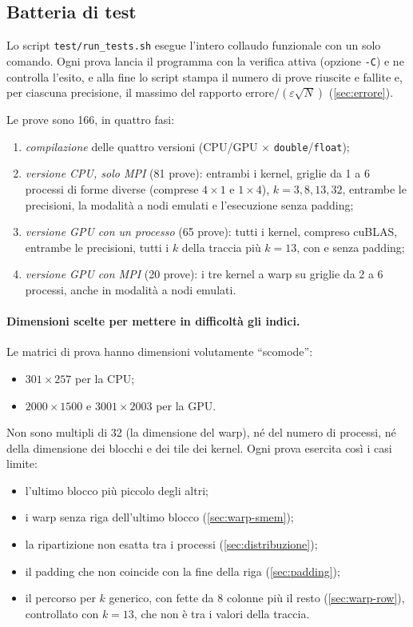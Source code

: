 \documentclass[11pt,a4paper]{article}
\begin{document}
\subsection{Batteria di test}\label{sec:batteria}

Lo script \texttt{test/run\_tests.sh} esegue l'intero collaudo funzionale con un
solo comando. Ogni prova lancia il programma con la verifica attiva (opzione
\texttt{-C}) e ne controlla l'esito, e alla fine lo script stampa il numero di
prove riuscite e fallite e, per ciascuna precisione, il massimo del rapporto
$\text{errore}/(\varepsilon\sqrt{N})$ (\cref{sec:errore}).

Le prove sono 166, in quattro fasi:
\begin{enumerate}
  \item \emph{compilazione} delle quattro versioni (CPU/GPU $\times$
        \texttt{double}/\texttt{float});
  \item \emph{versione CPU, solo MPI} (81 prove): entrambi i kernel, griglie da
        1 a 6 processi di forme diverse (comprese $4 \times 1$ e $1 \times 4$),
        $k = 3, 8, 13, 32$, entrambe le precisioni, la modalità a nodi emulati
        e l'esecuzione senza padding;
  \item \emph{versione GPU con un processo} (65 prove): tutti i kernel,
        compreso cuBLAS, entrambe le precisioni, tutti i $k$ della traccia più
        $k = 13$, con e senza padding;
  \item \emph{versione GPU con MPI} (20 prove): i tre kernel a warp su griglie
        da 2 a 6 processi, anche in modalità a nodi emulati.
\end{enumerate}

\paragraph{Dimensioni scelte per mettere in difficoltà gli indici.} Le matrici
di prova hanno dimensioni volutamente ``scomode'':
\begin{itemize}
  \item $301 \times 257$ per la CPU;
  \item $2000 \times 1500$ e $3001 \times 2003$ per la GPU.
\end{itemize}
Non sono multipli di 32 (la dimensione del warp), né del numero di processi, né
della dimensione dei blocchi e dei tile dei kernel. Ogni prova esercita così i
casi limite:
\begin{itemize}
  \item l'ultimo blocco più piccolo degli altri;
  \item i warp senza riga dell'ultimo blocco (\cref{sec:warp-smem});
  \item la ripartizione non esatta tra i processi (\cref{sec:distribuzione});
  \item il padding che non coincide con la fine della riga (\cref{sec:padding});
  \item il percorso per $k$ generico, con fette da 8 colonne più il resto
        (\cref{sec:warp-row}), controllato con $k = 13$, che non è tra i
        valori della traccia.
\end{itemize}
\end{document}
